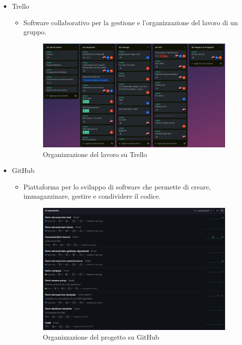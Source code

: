 \documentclass{report}
\begin{document}
\begin{itemize}
	\item Trello
	\begin{itemize}
		\item Software collaborativo per la gestione e l'organizzazione del lavoro di un gruppo.
		\begin{figure}[H]
			\centering
			\includegraphics[width=1\textwidth]{images/trello-image.jpg}
			\caption{Organizzazione del lavoro su Trello}
		\end{figure}	
	\end{itemize}
	\item GitHub
	\begin{itemize}
		\item Piattaforma per lo sviluppo di software che permette di creare, immagazzinare, gestire e condividere il codice.
	    \begin{figure}[H]
	    	\centering
	    	\includegraphics[width=1\textwidth]{images/github-image1.jpg}
	    	\caption{Organizzazione del progetto su GitHub}

\end{figure}
\end{itemize}
\end{itemize}
\end{document}
